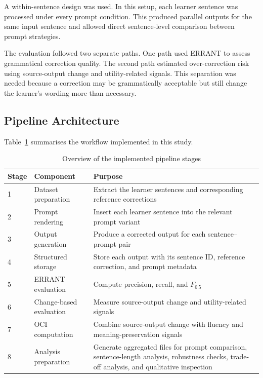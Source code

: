 A within-sentence design was used. In this setup, each learner sentence was processed under every prompt condition. This produced parallel outputs for the same input sentence and allowed direct sentence-level comparison between prompt strategies.

The evaluation followed two separate paths. One path used ERRANT to assess grammatical correction quality. The second path estimated over-correction risk using source-output change and utility-related signals. This separation was needed because a correction may be grammatically acceptable but still change the learner's wording more than necessary.

\subsection{Pipeline Architecture}

Table~\ref{tab:chapter4_pipeline_stages} summarises the workflow implemented in this study.

\begin{table}[htbp]
    \centering
    \caption{Overview of the implemented pipeline stages}
    \label{tab:chapter4_pipeline_stages}
    \begin{tabular}{|p{2cm}|p{4cm}|p{7cm}|}
        \hline
        \textbf{Stage} & \textbf{Component} & \textbf{Purpose} \\
        \hline
        1 & Dataset preparation & Extract the learner sentences and corresponding reference corrections \\
        \hline
        2 & Prompt rendering & Insert each learner sentence into the relevant prompt variant \\
        \hline
        3 & Output generation & Produce a corrected output for each sentence--prompt pair \\
        \hline
        4 & Structured storage & Store each output with its sentence ID, reference correction, and prompt metadata \\
        \hline
        5 & ERRANT evaluation & Compute precision, recall, and $F_{0.5}$ \\
        \hline
        6 & Change-based evaluation & Measure source-output change and utility-related signals \\
        \hline
        7 & OCI computation & Combine source-output change with fluency and meaning-preservation signals \\
        \hline
        8 & Analysis preparation & Generate aggregated files for prompt comparison, sentence-length analysis, robustness checks, trade-off analysis, and qualitative inspection \\
        \hline
    \end{tabular}
\end{table}


